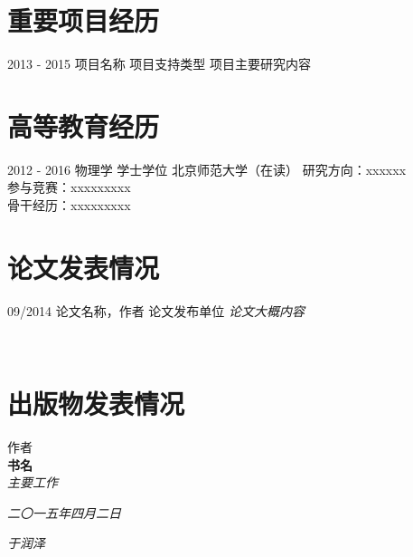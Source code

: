 \documentclass[]{friggeri-cv}
\begin{document}
\section{\cuti 重要项目经历}
\begin{entrylist}
  \entry
    {2013 - 2015}
    {\cuti 项目名称}
    {项目支持类型}
    {项目主要研究内容\\}
\end{entrylist}

\section{\cuti 高等教育经历}
\begin{entrylist}
  \entry
    {2012 - 2016}
    {\cuti 物理学 学士学位}
    {北京师范大学（在读）}
    {研究方向：xxxxxx\\
    参与竞赛：xxxxxxxxx\\
    骨干经历：xxxxxxxxx\\}
\end{entrylist}

\section{\cuti 论文发表情况}
\begin{entrylist}
  \entry
    {09/2014}
    {\cuti 论文名称，作者}
    {论文发布单位}
    {\emph{论文大概内容}}
\end{entrylist}\\

\section{\cuti 出版物发表情况}
作者\\
\textbf{书名}\\
\emph{主要工作}
\\

\vspace{40pt}

\begin{flushright}
\emph{二〇一五年四月二日}
\end{flushright}
\begin{flushright}
\emph{于润泽}
\end{flushright}

% 
\end{document}

